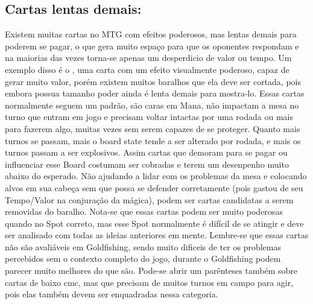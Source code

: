 \subsection{Cartas lentas demais:}
Existem muitas cartas no MTG com efeitos poderosos, mas lentas demais para poderem se pagar, o que gera muito espaço para que os oponentes respondam e na maiorias das vezes torna-se apenas um desperdicio de valor ou tempo.
Um exemplo disso é o , uma carta com um efeito visualmente poderoso, capaz de gerar muito valor, porém existem muitos baralhos que ela deve ser cortada, pois embora possua tamanho poder ainda é lenta demais para mostra-lo.
Essas cartas normalmente seguem um padrão, são caras em Mana, não impactam a mesa no turno que entram em jogo e precisam voltar intactas por uma rodada ou mais para fazerem algo, muitas vezes sem serem capazes de se proteger.
Quanto mais turnos se passam, mais o board state tende a ser alterado por rodada, e mais os turnos passam a ser explosivos. Assim cartas que demoram para se pagar ou influenciar esse Board costumam ser cobradas e terem um desenpenho muito abaixo do esperado.
Não ajudando a lidar com os problemas da mesa e colocando alvos em sua cabeça sem que possa se defender corretamente (pois gastou de seu Tempo/Valor na conjuração da mágica), podem ser cartas candidatas a serem removidas do baralho.
Nota-se que essas cartas podem ser muito poderosas quando no Spot correto, mas esse Spot normalmente é difícil de se atingir e deve ser analisado com todas as ideias anteriores em mente. Lembre-se que essas cartas não são avaliáveis em Goldfishing, sendo muito dificeis de ter os problemas percebidos sem o contexto completo do jogo, durante o Goldfishing podem parecer muito melhores do que são.
Pode-se abrir um parênteses também sobre cartas de baixo cmc, mas que precisam de muitos turnos em campo para agir, pois elas também devem ser enquadradas nessa categoria. 


